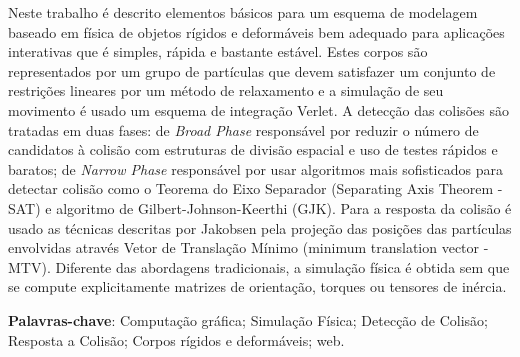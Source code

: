 \begin{resumo}
	\begin{SingleSpace}
		Neste trabalho é descrito elementos básicos para um esquema de modelagem baseado em física de objetos rígidos e deformáveis bem adequado para aplicações interativas que é simples, rápida e bastante estável. Estes corpos são representados por um grupo de partículas que devem satisfazer um conjunto de restrições lineares por um método de relaxamento e a simulação de seu movimento é usado um esquema de integração Verlet. A detecção das colisões são tratadas em duas fases: de \textit{Broad Phase} responsável por reduzir o número de candidatos à colisão com estruturas de divisão espacial e uso de testes rápidos e baratos; de \textit{Narrow Phase} responsável por usar algoritmos mais sofisticados para detectar colisão como o Teorema do Eixo Separador (Separating Axis Theorem - SAT) e algoritmo de Gilbert-Johnson-Keerthi (GJK). Para a resposta da colisão é usado as técnicas descritas por Jakobsen pela projeção das posições das partículas envolvidas através Vetor de Translação Mínimo (minimum translation vector - MTV). Diferente das abordagens tradicionais, a simulação física é obtida sem que se compute explicitamente matrizes de orientação, torques ou tensores de inércia.
	\end{SingleSpace}
	\vspace{\onelineskip}
	\textbf{Palavras-chave}: Computação gráfica; Simulação Física; Detecção de Colisão; Resposta a Colisão; Corpos rígidos e deformáveis; web.
\end{resumo}


